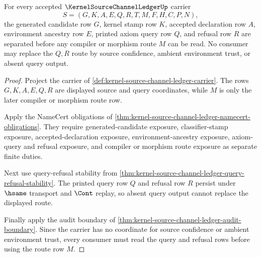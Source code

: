 \begin{theorem}
\label{thm:kernel-source-channel-ledger-source-query-separation}
For every accepted $\KernelSourceChannelLedgerUp$ carrier
$$
S=(G,K,A,E,Q,R,T,M,F,H,C,P,N),
$$
the generated candidate row $G$, kernel stamp row $K$, accepted declaration row $A$, environment ancestry row $E$, printed axiom query row $Q$, and refusal row $R$ are separated before any compiler or morphism route $M$ can be read. No consumer may replace the $Q,R$ route by source confidence, ambient environment trust, or absent query output.
\end{theorem}
\begin{proof}
Project the carrier of \autoref{def:kernel-source-channel-ledger-carrier}. The rows $G,K,A,E,Q,R$ are displayed source and query coordinates, while $M$ is only the later compiler or morphism route row.

Apply the NameCert obligations of \autoref{thm:kernel-source-channel-ledger-namecert-obligations}. They require generated-candidate exposure, classifier-stamp exposure, accepted-declaration exposure, environment-ancestry exposure, axiom-query and refusal exposure, and compiler or morphism route exposure as separate finite duties.

Next use query-refusal stability from \autoref{thm:kernel-source-channel-ledger-query-refusal-stability}. The printed query row $Q$ and refusal row $R$ persist under $\hsame$ transport and $\Cont$ replay, so absent query output cannot replace the displayed route.

Finally apply the audit boundary of \autoref{thm:kernel-source-channel-ledger-audit-boundary}. Since the carrier has no coordinate for source confidence or ambient environment trust, every consumer must read the query and refusal rows before using the route row $M$.
\end{proof}

